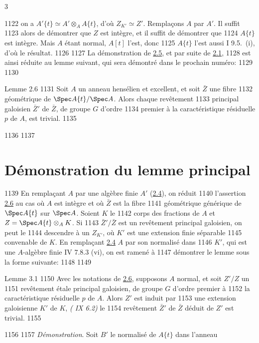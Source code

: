 3	\documentclass[10pt]{../fichiers-configuration-latex/smfart}
\begin{document}
  1122	on a $A'\{t\}\simeq A'\otimes_A A\{t\}$, d'où $Z_{K'}\simeq Z'$. Remplaçons $A$ par $A'$. Il suffit
  1123	alors de démontrer que $Z$ est intègre, et il suffit de démontrer que
  1124	$A\{t\}$ est intègre. Mais $A$ étant normal, $A[t]$ l'est, donc
  1125	$A\{t\}$ l'est aussi \sisi{(}{} I 9.5.~(i)\sisi{)}{}, d'où le résultat.
  1126	
  1127	La démonstration de \hyperref[XV.lem2.5]{2.5}, et par suite de \hyperref[XV.thm2.1]{2.1},
  1128	est ainsi réduite au lemme suivant, qui sera démontré dans le prochain numéro:
  1129	
  1130	\begin{enonce*}{Lemme 2.6}
  1131	Soit $A$ un anneau hensélien et excellent, et soit $\bar{Z}$ une fibre
  1132	géométrique de $\Spec A\{t\}/\Spec A$. Alors chaque revêtement
  1133	principal galoisien $\bar{Z}'$ de $\bar{Z}$, de groupe $G$ d'ordre
  1134	premier à la caractéristique résiduelle $p$ de $A$, est trivial.
  1135	\end{enonce*}
  1136	
  1137	\section{Démonstration du lemme principal}	
  1139	En remplaçant $A$ par une algèbre finie $A'$ (\cf \hyperref[XV.cor2.4]{2.4}), on réduit
  1140	l'assertion \hyperref[XV.lem2.6]{2.6} au cas où $A$ est intègre et où $\bar{Z}$ est la fibre
  1141	géométrique générique de $\Spec A\{t\}$ sur $\Spec A$. Soient $K$ le
  1142	corps des fractions de $A$ et $Z=\Spec A\{t\}\otimes_A K$. Si
  1143	$\bar{Z}'/\bar{Z}$ est un revêtement principal galoisien, on peut le
  1144	descendre à un $Z_{K'}$, où $K'$ est une extension finie séparable
  1145	convenable de $K$. En remplaçant \hyperref[XV.cor2.4]{2.4} $A$ par son normalisé dans
  1146	$K'$, qui est une $A$-algèbre finie \sisi{(}{}\EGA IV 7.8.3 (vi)\sisi{)}{}, on est ramené à
  1147	démontrer le lemme sous la forme suivante:
  1148	
  1149	\begin{enonce*}{Lemme 3.1}
  1150	Avec les notations de \hyperref[XV.lem2.6]{2.6}, supposons $A$ normal, et soit $Z'/Z$ un
  1151	revêtement étale principal galoisien, de groupe $G$ d'ordre premier à
  1152	la caractéristique résiduelle $p$ de $A$. Alors $Z'$ est induit par
  1153	une extension galoisienne $K'$ de $K$, \ie \emph{( IX 6.2)} le
  1154	revêtement $\bar{Z}'$ de $\bar{Z}$ déduit de $Z'$ est trivial.
  1155	\end{enonce*}
  1156	
  1157		\emph{Démonstration}. Soit $B'$ le normalisé de $A\{t\}$ dans l'anneau
\end{document}
